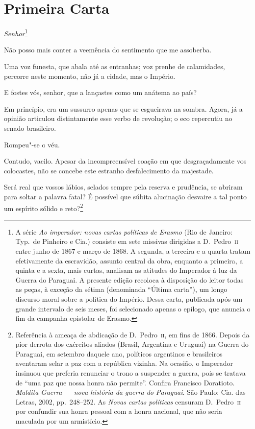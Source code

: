 \chapter{Primeira Carta}

\noindent\textit{Senhor}\footnote{ A série \textit{Ao imperador: novas cartas políticas de Erasmo}  
(Rio de Janeiro: Typ.~de Pinheiro e Cia.) consiste em sete missivas
dirigidas a D.~Pedro~\textsc{ii} entre junho de 1867 e março de 1868. A segunda,
a terceira e a quarta tratam efetivamente da escravidão, assunto
central da obra, enquanto a primeira, a quinta e a sexta, mais curtas,
analisam as atitudes do Imperador à luz da Guerra do Paraguai. A
presente edição recoloca à disposição do leitor todas as peças, à
exceção da sétima (denominada ``Última carta''), um longo discurso moral sobre a política
do Império. Dessa carta, publicada após um grande intervalo de seis
meses, foi selecionado apenas o epílogo, que anuncia o fim da
campanha epistolar de Erasmo.}\smallskip

Não posso mais conter a veemência do sentimento que me assoberba. 

Uma voz funesta, que abala até as entranhas; voz prenhe de calamidades,
percorre neste momento, não já a cidade, mas o Império. 

E fostes vós, senhor, que a lançastes como um anátema ao país? 

Em princípio, era um sussurro apenas que se esgueirava na sombra.
Agora, já a opinião articulou distintamente esse verbo de revolução; o
eco repercutiu no senado brasileiro. 

 Rompeu"-se o véu. 

 Contudo, vacilo. Apesar da incompreensível coação em que
desgraçadamente vos colocastes, não se concebe este estranho
desfalecimento da majestade. 

 Será real que vossos lábios, selados sempre pela reserva e prudência,
se abriram para soltar a palavra fatal? É possível que súbita
alucinação desvaire a tal ponto um espírito sólido e
reto?\footnote{ Referência à ameaça de abdicação de D.~Pedro~\textsc{ii}, em fins de 1866. Depois da pior
derrota dos exércitos aliados (Brasil, Argentina e Uruguai) na Guerra
do Paraguai, em setembro daquele ano, políticos argentinos e
brasileiros aventaram selar a paz com a república vizinha. Na ocasião,
o Imperador insinuou que preferia renunciar o trono a suspender a
guerra, pois se tratava de ``uma paz que nossa honra não permite''.
Confira Francisco Doratioto. \textit{Maldita Guerra --- nova história da
guerra do Paraguai}. São Paulo: Cia. das Letras, 2002, pp.~248--252.
As \textit{Novas cartas políticas} censuram D.~Pedro~\textsc{ii} por confundir
sua honra pessoal com a honra nacional, que não seria maculada por um armistício.}
 
